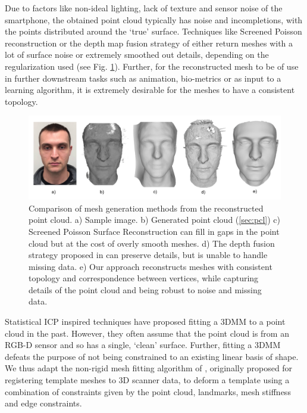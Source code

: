\documentclass[10pt,twocolumn,letterpaper]{article}
\begin{document}
Due to factors like non-ideal lighting, lack of texture and sensor noise of the smartphone, the obtained point cloud typically has noise and incompletions, with the points distributed around the `true' surface.
 Techniques like Screened Poisson reconstruction or the depth map fusion strategy of \cite{hernandez2015near} either return meshes with a lot of surface noise or extremely smoothed out details, depending on the regularization used (see Fig. \ref{fig:mesh_comp}). Further, for the reconstructed mesh to be of use in further downstream tasks such as animation, bio-metrics or as input to a learning algorithm, it is extremely desirable for the meshes to have a consistent topology. \\
 \begin{figure}[t]
\begin{center}
   \includegraphics[width=0.95\linewidth]{images/meshing_compare.png}
\end{center}
   \caption{Comparison of mesh generation methods from the reconstructed point cloud. a) Sample image. b) Generated point cloud (\ref{sec:pcl}) c) Screened Poisson Surface Reconstruction \cite{kazhdan2013screened} can fill in gaps in the point cloud but at the cost of overly smooth meshes. d) The depth fusion strategy proposed in \cite{hernandez2015near} can preserve details, but is unable to handle missing data. e) Our approach reconstructs meshes with consistent topology and correspondence between vertices, while capturing details of the point cloud and being robust to noise and missing data. }
\label{fig:mesh_comp}
\end{figure}

 Statistical ICP inspired techniques have proposed fitting a 3DMM to a point cloud \cite{schneider2009fitting,bazik2017robust,blanz2004statistical} in the past. However, they often assume that the point cloud is from an RGB-D sensor and so has a single, `clean' surface. Further, fitting a 3DMM defeats the purpose of not being constrained to an existing linear basis of shape.
 We thus adapt the non-rigid mesh fitting algorithm of \cite{amberg2007optimal}, originally proposed for registering template meshes to 3D scanner data, to deform a template using a combination of constraints given by the point cloud, landmarks, mesh stiffness and edge constraints. 
 
\end{document}
